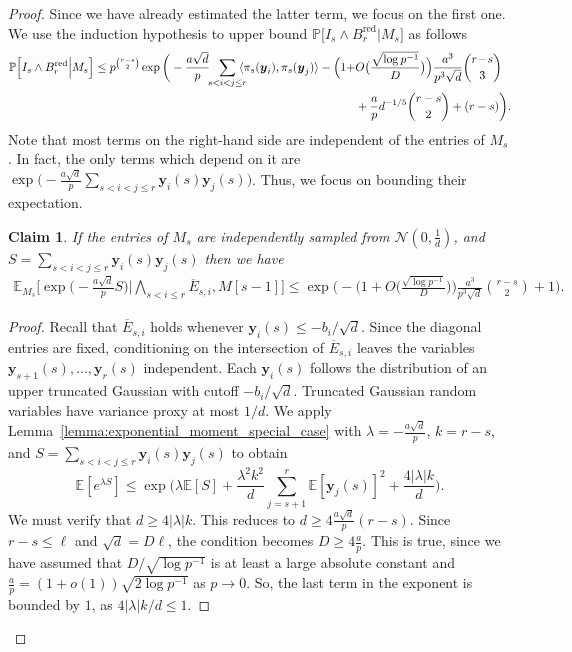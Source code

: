\documentclass[11pt]{amsart}
\newtheorem{claim}[theorem]{\bf Claim}
\theoremstyle{definition}
\def\cN{\mathcal{N}}
\def\bE{\mathbb{E}}
\def\Pb{\mathbb{P}}
\def\by{\boldsymbol{y}}
\DeclareMathOperator{\red}{red}
\begin{document}
\begin{proof}
Since we have already estimated the latter term, we focus on the first one. We use the induction hypothesis to upper bound $\Pb\Big[I_{s}\wedge B^{\red}_r\Big| M_{s}\Big]$ as follows
{\smaller[0.3]
\begin{align}\label{eq:induction_hypothesis_red}
    \Pb\Big[I_{s}\wedge B^{\red}_r\Big| M_{s}\Big]\leq p^{\binom{r-s}{2}}\exp\bigg(- \frac{a\sqrt{d}}{p}\!\!\sum_{s<i< j\leq r}\!\!\!\!\langle \pi_s(\by_i), \pi_s(\by_j)\rangle - \Big(1+&O\big( \frac{\sqrt{\log p^{-1}}}{D}\big)\Big)\frac{a^3}{p^3\sqrt{d}}\binom{r\!-\!s}{3}\! \\
    &+\frac{a}{p}d^{-1/5}\binom{r-s}{2}+(r-s)\bigg).\notag
\end{align}
}
Note that most terms on the right-hand side are independent of the entries of $M_s$. In fact, the only terms which depend on it are $\exp\Big(- \frac{a\sqrt{d}}{p}\sum_{s<i<j\leq r} \by_i(s)\by_j(s)\Big)$. Thus, we focus on bounding their expectation.

\begin{claim}\label{claim:auxiliary_gaussian_appendix_red}
If the entries of $M_s$ are independently sampled from $\cN(0, \frac{1}{d})$, and $S=\sum_{s<i<j\leq r}\by_i(s)\by_j(s)$ then we have
{\smaller[0.3]
\begin{align}
    \bE_{M_s}\bigg[\exp\bigg(- \frac{a\sqrt{d}}{p}S\bigg)\bigg| \bigwedge_{s<i\leq r}\!\! \overline{E}_{s, i}, M[s\!-\!1]\bigg]\leq  \exp\bigg(-\Big(1+O\big( \frac{\sqrt{\log p^{-1}}}{D}\big)\Big)\frac{a^3}{p^3\sqrt{d}}\binom{r-s}{2}+1\bigg).
\end{align}
}
\end{claim}
\begin{proof}
Recall that $\overline{E}_{s, i}$ holds whenever $\by_i(s)\leq -b_i/\sqrt{d}$. Since the diagonal entries are fixed, conditioning on the intersection of $\overline{E}_{s, i}$ leaves the variables $\by_{s+1}(s), \dots, \by_{r}(s)$ independent. Each $\by_i(s)$ follows the distribution of an upper truncated Gaussian with cutoff $-b_i/\sqrt{d}$.
Truncated Gaussian random variables have variance proxy at most $1/d$. We apply Lemma~\ref{lemma:exponential_moment_special_case} with $\lambda=-\frac{a\sqrt{d}}{p}$, $k=r-s$, and $S=\sum_{s<i<j\leq r}\by_i(s)\by_j(s)$ to obtain
{\smaller[0.3]
\[\bE[e^{\lambda S}]\leq \exp\bigg( \lambda \bE[S] \!+\! \frac{\lambda^2k^2}{d}\sum_{j=s+1}^r \bE [\by_j(s)]^2 \!+\!\frac{4|\lambda| k}{d}\bigg).\]
}
We must verify that $d\geq 4|\lambda| k$. This reduces to $d \geq 4  \frac{a\sqrt{d}}{p}(r-s)$. Since $r-s \leq \ell$ and $\sqrt{d}=D\ell$, the condition becomes $D \geq 4 \frac{a}{p}$. This is true, since we have assumed that $D/\sqrt{\log p^{-1}}$ is at least a large absolute constant and $\frac{a}{p}=(1+o(1))\sqrt{2\log p^{-1}}$ as $p\to 0$. So, the last term in the exponent is bounded by $1$, as $4|\lambda| k / d \leq 1$.


\end{proof}
\end{proof}
\end{document}
